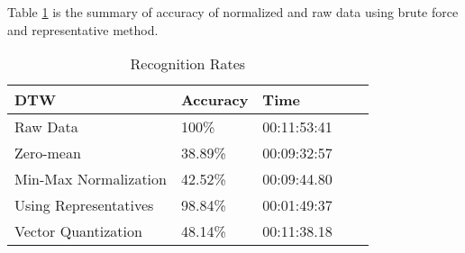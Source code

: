 Table \ref{table:5} is the summary of accuracy of normalized and raw data using brute force and representative method.

\hspace*{-1cm}\begin{table}[h]
	\centering
	\begin{tabular}{|l|l|l|l|l|}

\hline
DTW & Accuracy & Time \\ \hline\hline
Raw Data & 100\% & 00:11:53:41 \\ \hline
Zero-mean              &   38.89\%  & 00:09:32:57 \\ \hline
Min-Max Normalization  &   42.52\%  & 00:09:44.80 \\ \hline
Using Representatives  &  98.84\%   & 00:01:49:37 \\ \hline
Vector Quantization    &   48.14\%  & 00:11:38.18 \\ \hline

		
	\end{tabular}\hspace*{-1cm}
	\caption{Recognition Rates}
	\label{table:5}
\end{table}